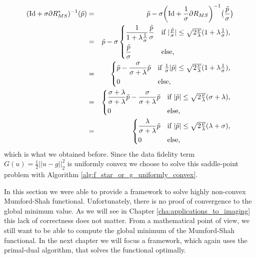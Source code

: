             \begin{eqnarray}
                (\textnormal{Id} + \sigma \partial R_{MS}^{\ast})^{-1}(\tilde{p}) &=& \tilde{p} - \sigma \bigg(\textnormal{Id} + \frac{1}{\sigma} \partial R_{MS}\bigg)^{-1}\big(\frac{\tilde{p}}{\sigma}\big) \notag \\
                &=& \tilde{p} - \sigma
                    \begin{dcases*}
                        \frac{1}{1 + \lambda\frac{1}{\sigma}}\frac{\tilde{p}}{\sigma} & \textnormal{if $|\frac{\tilde{p}}{\sigma}| \le \sqrt{2 \frac{\nu}{\lambda}}(1 + \lambda\frac{1}{\sigma})$,} \\
                        \frac{\tilde{p}}{\sigma} & \textnormal{else,}
                    \end{dcases*} \notag \\
                &=& \begin{dcases*}
                        \tilde{p} - \frac{\sigma}{\sigma + \lambda}\tilde{p} & \textnormal{if $\frac{1}{\sigma}|\tilde{p}| \le \sqrt{2 \frac{\nu}{\lambda}}(1 + \lambda\frac{1}{\sigma})$,} \\
                        0 & \textnormal{else,}
                    \end{dcases*} \notag \\
                &=& \begin{dcases*}
                        \frac{\sigma + \lambda}{\sigma + \lambda}\tilde{p} - \frac{\sigma}{\sigma + \lambda}\tilde{p} & \textnormal{if $|\tilde{p}| \le \sqrt{2 \frac{\nu}{\lambda}}(\sigma + \lambda)$,} \\
                        0 & \textnormal{else,}
                    \end{dcases*} \notag \\
                &=& \begin{dcases*}
                        \frac{\lambda}{\sigma + \lambda}\tilde{p} & \textnormal{if $|\tilde{p}| \le \sqrt{2 \frac{\nu}{\lambda}}(\lambda + \sigma)$,} \\
                        0 & \textnormal{else,}
                    \end{dcases*} \notag
            \end{eqnarray}
        which is what we obtained before. Since the data fidelity term $G(u) = \frac{1}{2} ||u - g||_{2}^{2}$ is uniformly convex we choose to solve this saddle-point problem with Algorithm \ref{alg:f_star_or_g_uniformly_convex}.

        In this section we were able to provide a framework to solve highly non-convex Mumford-Shah functional. Unfortunately, there is no proof of convergence to the global minimum value. As we will see in Chapter \ref{cha:applications_to_imaging} this lack of correctness does not matter. From a mathematical point of view, we still want to be able to compute the global minimum of the Mumford-Shah functional. In the next chapter we will focus a framework, which again uses the primal-dual algorithm, that solves the functional optimally.


